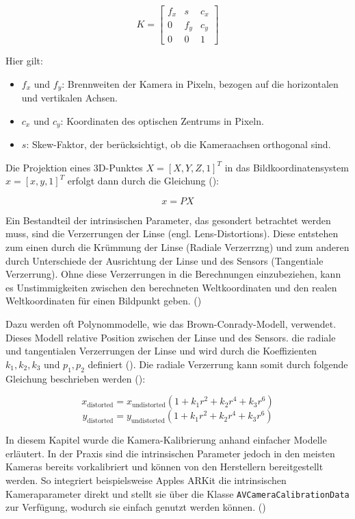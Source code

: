 \[
K = 
\begin{bmatrix}
f_x & s & c_x \\
0 & f_y & c_y \\
0 & 0 & 1
\end{bmatrix}
\]

Hier gilt:

\begin{itemize}
    \item \( f_x \) und \( f_y \): Brennweiten der Kamera in Pixeln, bezogen auf die horizontalen und vertikalen Achsen.
    \item \( c_x \) und \( c_y \): Koordinaten des optischen Zentrums in Pixeln.
    \item \( s \): Skew-Faktor, der berücksichtigt, ob die Kameraachsen orthogonal sind.
\end{itemize}

Die Projektion eines 3D-Punktes \( X = [X, Y, Z, 1]^T \) in das Bildkoordinatensystem \( x = [x, y, 1]^T \) erfolgt dann durch die Gleichung (\cite{mw2024calibration}):

\[
x = PX
\]

Ein Bestandteil der intrinsischen Parameter, das gesondert betrachtet werden muss, sind die Verzerrungen der Linse (engl. Lens-Distortions). Diese entstehen zum einen durch die Krümmung der Linse (Radiale Verzerrzng) und zum anderen durch Unterschiede der Ausrichtung der Linse und des Sensors (Tangentiale Verzerrung). Ohne diese Verzerrungen in die Berechnungen einzubeziehen, kann es Unstimmigkeiten zwischen den berechneten Weltkoordinaten und den realen Weltkoordinaten für einen Bildpunkt geben. (\cite{mw2024calibration, szeliski2022computerVision})

Dazu werden oft Polynommodelle, wie das Brown-Conrady-Modell, verwendet. Dieses Modell relative Position zwischen der Linse und des Sensors. die radiale und tangentialen Verzerrungen der Linse und wird durch die Koeffizienten \( k_1, k_2, k_3 \) und \( p_1, p_2 \) definiert (\cite{brown1966distortion}). Die radiale Verzerrung kann somit durch folgende Gleichung beschrieben werden (\cite{mw2024calibration, szeliski2022computerVision}):

\[
x_{\text{distorted}}   
=
x_{\text{undistorted}}
\left( 1 + k_1 r^2 + k_2 r^4 + k_3 r^6 \right)
\]
\[
y_{\text{distorted}}   
=
y_{\text{undistorted}}
\left( 1 + k_1 r^2 + k_2 r^4 + k_3 r^6 \right)
\]

In diesem Kapitel wurde die Kamera-Kalibrierung anhand einfacher Modelle erläutert. In der Praxis sind die intrinsischen Parameter jedoch in den meisten Kameras bereits vorkalibriert und können von den Herstellern bereitgestellt werden. So integriert beispielsweise Apples ARKit die intrinsischen Kameraparameter direkt und stellt sie über die Klasse \texttt{AVCameraCalibrationData} zur Verfügung, wodurch sie einfach genutzt werden können. (\cite{appledevdoc})

